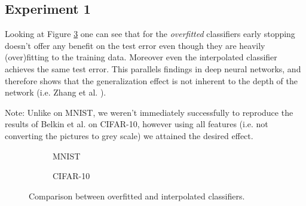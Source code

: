 
\subsection{Experiment 1}

 Looking at Figure \ref{fig:1} one can see that for the \textit{overfitted} classifiers early stopping doesn't offer any benefit on the test error even though they are heavily (over)fitting to the training data. Moreover even the interpolated classifier achieves the same test error. This parallels findings in deep neural networks, and therefore shows that the generalization effect is not inherent to the depth of the network (i.e. Zhang et al. \cite{zhang2017}).

 Note: Unlike on MNIST, we weren't immediately successfully to reproduce the results of Belkin et al. on CIFAR-10, however using all features (i.e. not converting the pictures to grey scale) we attained the desired effect.

\begin{figure}[!htb]
\begin{subfigure}{0.49\textwidth}
\caption{MNIST} \label{fig:1a}
\end{subfigure}
\hspace*{\fill} %
\begin{subfigure}{0.49\textwidth}
\caption{CIFAR-10} \label{fig:1b}
\end{subfigure}
\caption{Comparison between overfitted and interpolated classifiers.} \label{fig:1}
\end{figure}
